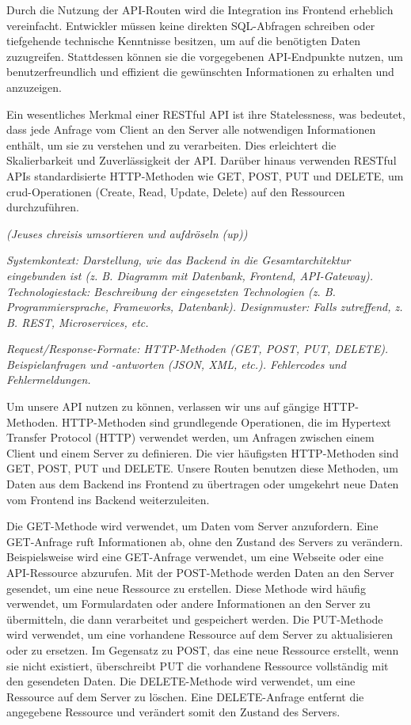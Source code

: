 \documentclass[a4paper,12pt]{article}
\begin{document}
Durch die Nutzung der API-Routen wird die Integration ins Frontend erheblich vereinfacht. Entwickler müssen keine direkten SQL-Abfragen schreiben oder tiefgehende technische Kenntnisse besitzen, um auf die benötigten Daten zuzugreifen. Stattdessen können sie die vorgegebenen API-Endpunkte nutzen, um benutzerfreundlich und effizient die gewünschten Informationen zu erhalten und anzuzeigen. 

Ein wesentliches Merkmal einer RESTful API ist ihre Statelessness, was bedeutet, dass jede Anfrage vom Client an den Server alle notwendigen Informationen enthält, um sie zu verstehen und zu verarbeiten. Dies erleichtert die Skalierbarkeit und Zuverlässigkeit der API. Darüber hinaus verwenden RESTful APIs standardisierte HTTP-Methoden wie GET, POST, PUT und DELETE, um \gls{crud}-Operationen (Create, Read, Update, Delete) auf den Ressourcen durchzuführen. 

\textit{(Jeuses chreisis umsortieren und aufdröseln (up))}

\textit{Systemkontext: Darstellung, wie das Backend in die Gesamtarchitektur
eingebunden ist (z. B. Diagramm mit Datenbank, Frontend, API-Gateway).
Technologiestack: Beschreibung der eingesetzten Technologien (z. B.
Programmiersprache, Frameworks, Datenbank).
Designmuster: Falls zutreffend, z. B. REST, Microservices, etc. }



\textit{Request/Response-Formate: HTTP-Methoden (GET, POST, PUT, DELETE).
Beispielanfragen und -antworten (JSON, XML, etc.).  Fehlercodes und
Fehlermeldungen.}

Um unsere API nutzen zu können, verlassen wir uns auf gängige HTTP-Methoden. HTTP-Methoden sind grundlegende Operationen, die im Hypertext Transfer Protocol (HTTP) verwendet werden, um Anfragen zwischen einem Client und einem Server zu definieren. Die vier häufigsten HTTP-Methoden sind GET, POST, PUT und DELETE. Unsere Routen benutzen diese Methoden, um Daten aus dem Backend ins Frontend zu übertragen oder umgekehrt neue Daten vom Frontend ins Backend weiterzuleiten.
 
Die GET-Methode wird verwendet, um Daten vom Server anzufordern. Eine GET-Anfrage ruft Informationen ab, ohne den Zustand des Servers zu verändern. Beispielsweise wird eine GET-Anfrage verwendet, um eine Webseite oder eine API-Ressource abzurufen.
Mit der POST-Methode werden Daten an den Server gesendet, um eine neue Ressource zu erstellen. Diese Methode wird häufig verwendet, um Formulardaten oder andere Informationen an den Server zu übermitteln, die dann verarbeitet und gespeichert werden.
Die PUT-Methode wird verwendet, um eine vorhandene Ressource auf dem Server zu aktualisieren oder zu ersetzen. Im Gegensatz zu POST, das eine neue Ressource erstellt, wenn sie nicht existiert, überschreibt PUT die vorhandene Ressource vollständig mit den gesendeten Daten.
Die DELETE-Methode wird verwendet, um eine Ressource auf dem Server zu löschen. Eine DELETE-Anfrage entfernt die angegebene Ressource und verändert somit den Zustand des Servers.
\end{document}
